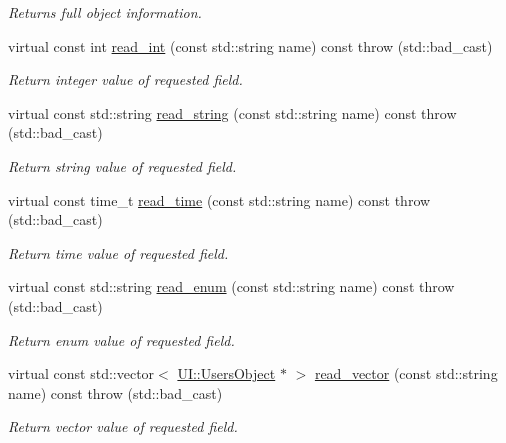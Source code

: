 \begin{DoxyCompactItemize}
\begin{DoxyCompactList}\small\item\em Returns full object information. \item\end{DoxyCompactList}\item 
virtual const int \hyperlink{classCore_1_1AbstractGroup_a7e15ec9b621230659a5ca2f0be724d83}{read\_\-int} (const std::string name) const   throw (std::bad\_\-cast)
\begin{DoxyCompactList}\small\item\em Return integer value of requested field. \item\end{DoxyCompactList}\item 
virtual const std::string \hyperlink{classCore_1_1AbstractGroup_a907fc505a7f7828fcd2e7f6eaf5e27cd}{read\_\-string} (const std::string name) const   throw (std::bad\_\-cast)
\begin{DoxyCompactList}\small\item\em Return string value of requested field. \item\end{DoxyCompactList}\item 
virtual const time\_\-t \hyperlink{classCore_1_1AbstractGroup_af52530d29e3b8f0047a0c0675dc6c912}{read\_\-time} (const std::string name) const   throw (std::bad\_\-cast)
\begin{DoxyCompactList}\small\item\em Return time value of requested field. \item\end{DoxyCompactList}\item 
virtual const std::string \hyperlink{classCore_1_1AbstractGroup_a2f373e90feaad172563c6256ae30a6a6}{read\_\-enum} (const std::string name) const   throw (std::bad\_\-cast)
\begin{DoxyCompactList}\small\item\em Return enum value of requested field. \item\end{DoxyCompactList}\item 
virtual const std::vector$<$ \hyperlink{classUI_1_1UsersObject}{UI::UsersObject} $\ast$ $>$ \hyperlink{classCore_1_1AbstractGroup_ab582f4364426a152875742278ba0d999}{read\_\-vector} (const std::string name) const   throw (std::bad\_\-cast)
\begin{DoxyCompactList}\small\item\em Return vector value of requested field. \item\end{DoxyCompactList}\item 

\end{DoxyCompactItemize}
